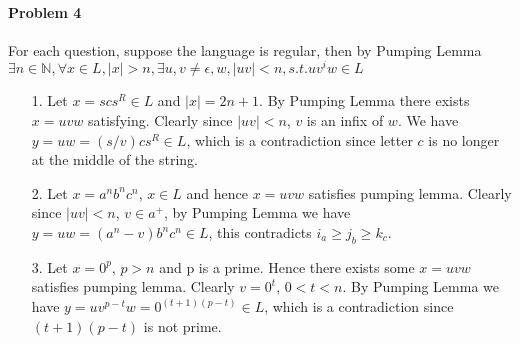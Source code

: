 \documentclass[12pt]{article}
\begin{document}
\paragraph{Problem 4}

For each question,
suppose the language is regular,
then by Pumping Lemma $\exists n \in \mathbb{N}, \forall x \in L, |x|>n, \exists u,v\not=\epsilon,w, |uv|<n, s.t. uv^iw \in L$

\begin{itemize}
\item[1.]
Let $x=scs^R \in L$ and $|x|=2n+1$.
By Pumping Lemma there exists $x=uvw$ satisfying.
Clearly since $|uv|<n$,
$v$ is an infix of $w$.
We have $y=uw=(s / v)cs^R \in L$,
which is a contradiction since letter $c$ is no longer at the middle of the string.
\item[2.]
Let $x=a^nb^nc^n$,
$x \in L$ and hence $x=uvw$ satisfies pumping lemma.
Clearly since $|uv|<n$, $v \in a^+$,
by Pumping Lemma we have $y=uw=(a^n-v)b^nc^n \in L$,
this contradicts $i_a \geq j_b \geq k_c$. 
\item[3.]
Let $x=0^p$, $p>n$ and p is a prime.
Hence there exists some $x=uvw$ satisfies pumping lemma.
Clearly $v=0^t$, $0<t<n$.
By Pumping Lemma we have $y=uv^{p-t}w=0^{(t+1)(p-t)} \in L$,
which is a contradiction since $(t+1)(p-t)$ is not prime.
\end{itemize}
\end{document}
